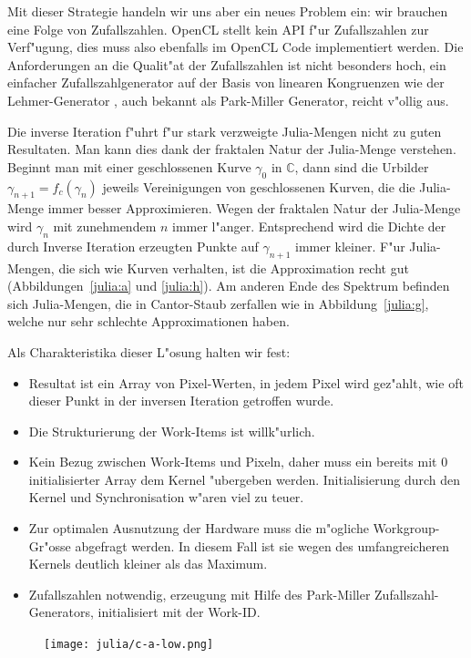 \begin{refsection}
Mit dieser Strategie handeln wir uns aber ein neues Problem ein: wir brauchen
eine Folge von Zufallszahlen.
OpenCL stellt kein API f"ur Zufallszahlen zur Verf"ugung, dies muss also
ebenfalls im OpenCL Code implementiert werden.
Die Anforderungen an die Qualit"at der Zufallszahlen ist nicht besonders
hoch, ein einfacher Zufallszahlgenerator auf der Basis von linearen
Kongruenzen wie der Lehmer-Generator \cite{julia:lehmer},
auch bekannt als Park-Miller Generator, reicht v"ollig aus.

Die inverse Iteration f"uhrt f"ur stark verzweigte Julia-Mengen nicht
zu guten Resultaten.
Man kann dies dank der fraktalen Natur der Julia-Menge verstehen.
Beginnt man mit einer geschlossenen Kurve $\gamma_0$ in $\mathbb C$,
dann sind die Urbilder $\gamma_{n+1} = f_c(\gamma_n)$ jeweils Vereinigungen
von geschlossenen Kurven, die die Julia-Menge immer besser Approximieren.
Wegen der fraktalen Natur der Julia-Menge wird $\gamma_{n}$ mit zunehmendem
$n$ immer l"anger.
Entsprechend wird die Dichte der durch Inverse Iteration
erzeugten Punkte auf $\gamma_{n+1}$ immer kleiner. 
F"ur Julia-Mengen, die sich wie Kurven verhalten, ist die Approximation
recht gut (Abbildungen~\ref{julia:a} und \ref{julia:h}).
Am anderen Ende des Spektrum befinden sich Julia-Mengen, die in Cantor-Staub
zerfallen wie in Abbildung~\ref{julia:g}, welche nur sehr schlechte
Approximationen haben.

Als Charakteristika dieser L"osung halten wir fest:
\begin{itemize}
\item Resultat ist ein Array von Pixel-Werten, in jedem Pixel wird
gez"ahlt, wie oft dieser Punkt in der inversen Iteration getroffen wurde.
\item Die Strukturierung der Work-Items ist willk"urlich.
\item Kein Bezug zwischen Work-Items und Pixeln, daher muss ein bereits
mit 0 initialisierter Array dem Kernel "ubergeben werden.
Initialisierung durch den Kernel und Synchronisation w"aren viel zu teuer.
\item
Zur optimalen Ausnutzung der
Hardware muss die m"ogliche Workgroup-Gr"osse abgefragt werden.
In diesem Fall ist sie wegen des umfangreicheren
Kernels deutlich kleiner als das Maximum.
\item
Zufallszahlen notwendig, erzeugung mit Hilfe des Park-Miller
Zufallszahl-Generators, initialisiert mit der Work-ID.
\end{itemize}

\begin{figure}
\begin{center}
\texttt{[image: julia/c-a-low.png]}


\end{center}
\end{figure}
\end{refsection}
